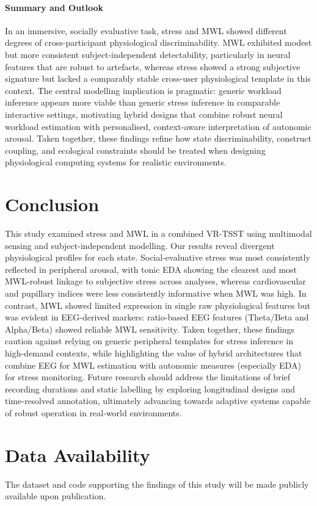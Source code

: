 \documentclass[lettersize,journal]{IEEEtran}
\begin{document}
\paragraph{Summary and Outlook}
In an immersive, socially evaluative task, stress and MWL showed different degrees of cross-participant physiological discriminability. MWL exhibited modest but more consistent subject-independent detectability, particularly in neural features that are robust to artefacts, whereas stress showed a strong subjective signature but lacked a comparably stable cross-user physiological template in this context. The central modelling implication is pragmatic: generic workload inference appears more viable than generic stress inference in comparable interactive settings, motivating hybrid designs that combine robust neural workload estimation with personalised, context-aware interpretation of autonomic arousal. Taken together, these findings refine how state discriminability, construct coupling, and ecological constraints should be treated when designing physiological computing systems for realistic environments.


\section{Conclusion}
This study examined stress and MWL in a combined VR-TSST using multimodal sensing and subject-independent modelling. Our results reveal divergent physiological profiles for each state. Social-evaluative stress was most consistently reflected in peripheral arousal, with tonic EDA showing the clearest and most MWL-robust linkage to subjective stress across analyses, whereas cardiovascular and pupillary indices were less consistently informative when MWL was high. In contrast, MWL showed limited expression in single raw physiological features but was evident in EEG-derived markers: ratio-based EEG features (Theta/Beta and Alpha/Beta) showed reliable MWL sensitivity. Taken together, these findings caution against relying on generic peripheral templates for stress inference in high-demand contexts, while highlighting the value of hybrid architectures that combine EEG for MWL estimation with autonomic measures (especially EDA) for stress monitoring. Future research should address the limitations of brief recording durations and static labelling by exploring longitudinal designs and time-resolved annotation, ultimately advancing towards adaptive systems capable of robust operation in real-world environments.

\section*{Data Availability}
The dataset and code supporting the findings of this study will be made publicly available upon publication.






\newpage






\vfill
\end{document}
